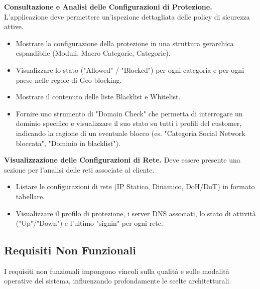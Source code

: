 \documentclass[12pt,a4paper,openright,twoside]{book}
\begin{document}
\begin{reqfunz}
    \item \label{req:protection} \textbf{Consultazione e Analisi delle Configurazioni di Protezione.} L'applicazione deve permettere un'ispezione dettagliata delle policy di sicurezza attive.
          \begin{itemize}
              \item Mostrare la configurazione della protezione in una struttura gerarchica espandibile (Moduli, Macro Categorie, Categorie).
              \item Visualizzare lo stato ("Allowed" / "Blocked") per ogni categoria e per ogni paese nelle regole di Geo-blocking.
              \item Mostrare il contenuto delle liste Blacklist e Whitelist.
              \item Fornire uno strumento di "Domain Check" che permetta di interrogare un dominio specifico e visualizzare il suo stato su tutti i profili del customer, indicando la ragione di un eventuale blocco (es. "Categoria Social Network bloccata", "Dominio in blacklist").
          \end{itemize}

    \item \label{req:network} \textbf{Visualizzazione delle Configurazioni di Rete.} Deve essere presente una sezione per l'analisi delle reti associate al cliente.
          \begin{itemize}
              \item Listare le configurazioni di rete (IP Statico, Dinamico, DoH/DoT) in formato tabellare.
              \item Visualizzare il profilo di protezione, i server DNS associati, lo stato di attività ("Up"/"Down") e l'ultimo "signin" per ogni rete.
          \end{itemize}
\end{reqfunz}

\subsection{Requisiti Non Funzionali}
\label{subsec:req_non_funzionali}
I requisiti non funzionali impongono vincoli sulla qualità e sulle modalità operative del sistema, influenzando profondamente le scelte architetturali.
\end{document}
